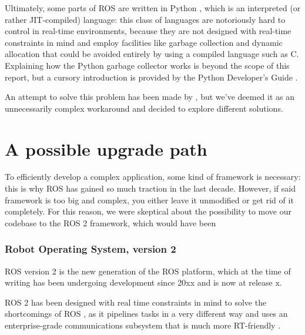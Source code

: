 \documentclass[a4paper,12pt]{report}
\begin{document}

Ultimately, some parts of ROS are written in Python \cite{roswiki-rospy}, which is an interpreted (or rather JIT-compiled) language: this class of languages are notoriously hard to control in real-time environments, because they are not designed with real-time constraints in mind and employ facilities like garbage collection and dynamic allocation that could be avoided entirely by using a compiled language such as C. Explaining how the Python garbage collector works is beyond the scope of this report, but a cursory introduction is provided by the Python Developer's Guide \cite{python-devguide-gc}.

An attempt to solve this problem has been made by \textcite{rt-ros-approach}, but we've deemed it as an unnecessarily complex workaround and decided to explore different solutions.

\section{A possible upgrade path}

To efficiently develop a complex application, some kind of framework is necessary: this is why ROS has gained so much traction in the last decade. However, if said framework is too big and complex, you either leave it unmodified or get rid of it completely. For this reason, we were skeptical about the possibility to move our codebase to the ROS 2 framework, which would have been 

\subsubsection{Robot Operating System, version 2}

ROS version 2 is the new generation of the ROS platform, which at the time of writing has been undergoing development since 20xx and is now at release x.

ROS 2 has been designed with real time constraints in mind to solve the shortcomings of ROS \cite{ros2-realtime-intro}, as it pipelines tasks in a very different way and uses an enterprise-grade communications subsystem that is much more RT-friendly . 
\end{document}
